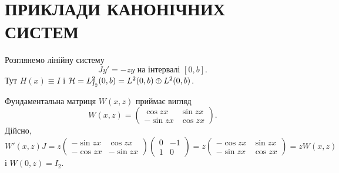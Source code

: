 \section{ПРИКЛАДИ КАНОНІЧНИХ СИСТЕМ}

\begin{example}
	Розглянемо лінійну систему
	\begin{equation}\label{eq-4.25}
		Jy'=-zy \text{ на інтервалі } [0,b].
	\end{equation}
	Тут $H(x)\equiv I$ і $\mathcal{H} = L^2_{I_2}(0,b) = L^2(0,b)\oplus L^2(0,b)$.

	Фундаментальна матриця $W(x,z)$ приймає вигляд
	\begin{equation}\label{eq-4.26}
	  	W(x,z) = 
	  	\begin{pmatrix}
	  		\cos{zx} & \sin{zx}\\
	  		-\sin{zx} & \cos{zx}
	  	\end{pmatrix}.
	\end{equation}
	Дійсно,
	\begin{equation*}
		W'(x,z)J = z
		\begin{pmatrix}
	  		-\sin{zx} & \cos{zx}\\
	  		-\cos{zx} & -\sin{zx}
	  	\end{pmatrix}
	  	\begin{pmatrix}
	  		0 & -1\\
	  		1 & 0
	  	\end{pmatrix}
	  	= z
	  	\begin{pmatrix}
	  		-\cos{zx} & \sin{zx}\\
	  		-\sin{zx} & \cos{zx}
	  	\end{pmatrix}
	  	=zW(x,z)
	\end{equation*}
	і $W(0,z) = I_2$.


\end{example}
